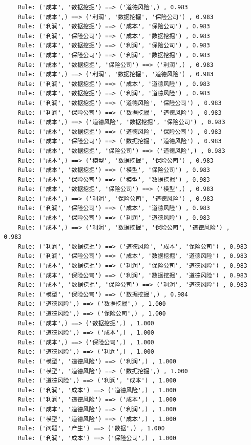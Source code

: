 \documentclass[lang=cn,11pt,a4paper,cite=authoryear]{elegantpaper}
\begin{document}
\begin{lstlisting}
	Rule: ('成本', '数据挖掘') ==> ('道德风险',) , 0.983
	Rule: ('成本',) ==> ('利润', '数据挖掘', '保险公司') , 0.983
	Rule: ('利润', '数据挖掘') ==> ('成本', '保险公司') , 0.983
	Rule: ('利润', '保险公司') ==> ('成本', '数据挖掘') , 0.983
	Rule: ('成本', '数据挖掘') ==> ('利润', '保险公司') , 0.983
	Rule: ('成本', '保险公司') ==> ('利润', '数据挖掘') , 0.983
	Rule: ('成本', '数据挖掘', '保险公司') ==> ('利润',) , 0.983
	Rule: ('成本',) ==> ('利润', '数据挖掘', '道德风险') , 0.983
	Rule: ('利润', '数据挖掘') ==> ('成本', '道德风险') , 0.983
	Rule: ('成本', '数据挖掘') ==> ('利润', '道德风险') , 0.983
	Rule: ('利润', '数据挖掘') ==> ('道德风险', '保险公司') , 0.983
	Rule: ('利润', '保险公司') ==> ('数据挖掘', '道德风险') , 0.983
	Rule: ('成本',) ==> ('道德风险', '数据挖掘', '保险公司') , 0.983
	Rule: ('成本', '数据挖掘') ==> ('道德风险', '保险公司') , 0.983
	Rule: ('成本', '保险公司') ==> ('数据挖掘', '道德风险') , 0.983
	Rule: ('成本', '数据挖掘', '保险公司') ==> ('道德风险',) , 0.983
	Rule: ('成本',) ==> ('模型', '数据挖掘', '保险公司') , 0.983
	Rule: ('成本', '数据挖掘') ==> ('模型', '保险公司') , 0.983
	Rule: ('成本', '保险公司') ==> ('模型', '数据挖掘') , 0.983
	Rule: ('成本', '数据挖掘', '保险公司') ==> ('模型',) , 0.983
	Rule: ('成本',) ==> ('利润', '保险公司', '道德风险') , 0.983
	Rule: ('利润', '保险公司') ==> ('成本', '道德风险') , 0.983
	Rule: ('成本', '保险公司') ==> ('利润', '道德风险') , 0.983
	Rule: ('成本',) ==> ('利润', '数据挖掘', '保险公司', '道德风险') , 0.983
	Rule: ('利润', '数据挖掘') ==> ('道德风险', '成本', '保险公司') , 0.983
	Rule: ('利润', '保险公司') ==> ('成本', '数据挖掘', '道德风险') , 0.983
	Rule: ('成本', '数据挖掘') ==> ('利润', '保险公司', '道德风险') , 0.983
	Rule: ('成本', '保险公司') ==> ('利润', '数据挖掘', '道德风险') , 0.983
	Rule: ('成本', '数据挖掘', '保险公司') ==> ('利润', '道德风险') , 0.983
	Rule: ('模型', '保险公司') ==> ('数据挖掘',) , 0.984
	Rule: ('道德风险',) ==> ('数据挖掘',) , 1.000
	Rule: ('道德风险',) ==> ('保险公司',) , 1.000
	Rule: ('成本',) ==> ('数据挖掘',) , 1.000
	Rule: ('道德风险',) ==> ('成本',) , 1.000
	Rule: ('成本',) ==> ('保险公司',) , 1.000
	Rule: ('道德风险',) ==> ('利润',) , 1.000
	Rule: ('模型', '道德风险') ==> ('利润',) , 1.000
	Rule: ('模型', '道德风险') ==> ('数据挖掘',) , 1.000
	Rule: ('道德风险',) ==> ('利润', '成本') , 1.000
	Rule: ('利润', '成本') ==> ('道德风险',) , 1.000
	Rule: ('利润', '道德风险') ==> ('成本',) , 1.000
	Rule: ('成本', '道德风险') ==> ('利润',) , 1.000
	Rule: ('模型', '道德风险') ==> ('成本',) , 1.000
	Rule: ('问题', '产生') ==> ('数据',) , 1.000
	Rule: ('利润', '成本') ==> ('保险公司',) , 1.000

\end{lstlisting}
\end{document}
